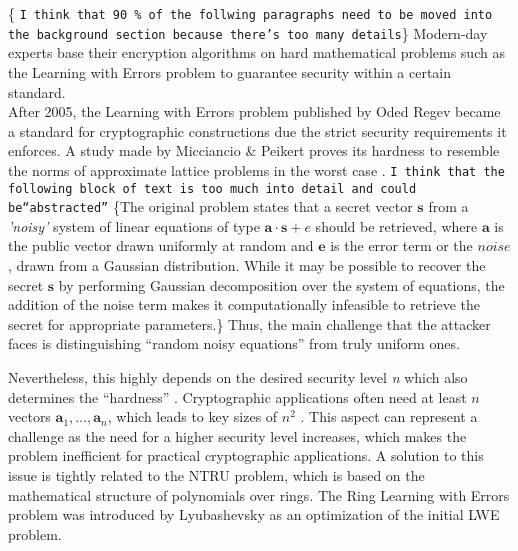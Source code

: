 \documentclass[11pt,
  titlepage=false,
  abstract=on,
]{scrreprt}
\begin{document}
\{ \texttt{I think that 90 \% of the follwing paragraphs need to be moved into the background section because there's too many details}\}
Modern-day experts base their encryption algorithms on hard mathematical problems such as the Learning with Errors problem to guarantee security within a certain standard.\\
After 2005, the Learning with Errors problem published by Oded Regev \cite{regev2010learning} became a standard for cryptographic constructions due the strict security requirements it enforces.
A study made by Micciancio \& Peikert proves its hardness to resemble the norms of approximate lattice problems in the worst case \cite{micciancio2013hardness}.
\texttt{I think that the following block of text is too much into detail and could be``abstracted''}
\{The original problem states that a secret vector $\textbf{s}$ from a \textit{'noisy'} system of linear equations of type $\textbf{a} \cdot \textbf{s} + e$ should be retrieved, where $\textbf{a}$ is the public
vector drawn uniformly at random and $\textbf{e}$ is the error term or the $noise$, drawn from a Gaussian distribution. While it may be possible to recover the secret $\textbf{s}$
by performing Gaussian decomposition over the system of equations, the addition of the noise term makes it computationally infeasible to retrieve the
secret for appropriate parameters.\} Thus, the main challenge that the attacker faces is distinguishing ``random noisy equations'' from truly uniform ones.

Nevertheless, 
this highly depends on the desired security level \textit{n} which also determines the ``hardness'' \cite{micciancio2013hardness}. 
Cryptographic applications often need at least  $n$ vectors $\textbf{a}_1,\ldots,\textbf{a}_n$, which leads to key sizes of $n^2$ \cite{regev2010learning}. This aspect can represent a challenge as the need for a higher 
security level increases, which makes the problem inefficient for practical cryptographic applications. A solution to this issue is tightly related to the NTRU problem, which is based on the mathematical structure of
polynomials over rings. The Ring Learning with Errors problem \cite{lyubashevsky2010ideal} was introduced by Lyubashevsky as an optimization of the initial LWE problem.
\end{document}
